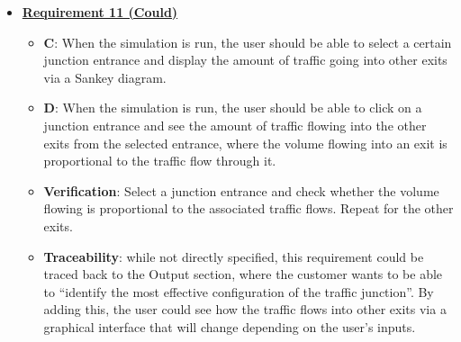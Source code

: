 \documentclass{article}
\begin{document}
\begin{itemize}
    \item \textbf{\underline{Requirement 11 (Could)}}
    \begin{itemize}
        \item \textbf{C}: When the simulation is run, the user should be able to select a certain junction entrance 
            and display the amount of traffic going into other exits via a 
            Sankey diagram.
        \item \textbf{D}: When the simulation is run, the user should be able to click on a junction entrance and see 
            the amount of traffic flowing into the other exits from the selected entrance, where the volume 
            flowing into an exit is proportional to the traffic flow through it.
        \item \textbf{Verification}: Select a junction entrance and check whether the volume flowing
            is proportional to the associated traffic flows. Repeat for the other exits.
        \item\textbf{Traceability}: while not directly specified, this requirement could be traced back 
            to the Output section, where the customer wants to be able to “identify the most effective 
            configuration of the traffic junction”. By adding this, the user could see how the traffic 
            flows into other exits via a graphical interface that will change depending on the user's 
            inputs.
    \end{itemize}



\end{itemize}
\end{document}
